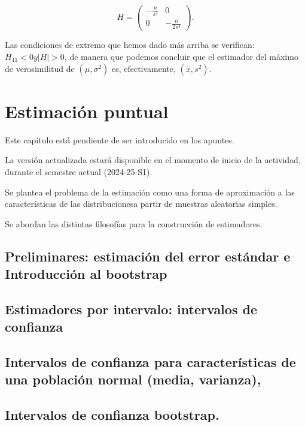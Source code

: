 \documentclass[
]{article}
\begin{document}
\[
H=\left(\begin{array}{cc}
-\frac{n}{s^{2}} & 0 \\
0 & -\frac{n}{2 s^{4}}
\end{array}\right) .
\]

Las condiciones de extremo que hemos dado más arriba se verifican: \(H_{11}<0 y|H|>0\), de manera que podemos concluir que el estimador del máximo de verosimilitud de \(\left(\mu, \sigma^{2}\right)\) es, efectivamente, \(\left(\bar{x}, s^{2}\right)\).

\section{Estimación puntual}\label{estimaciuxf3n-puntual-1}

Este capítulo está pendiente de ser introducido en los apuntes.

La versión actualizada estará disponible en el momento de inicio de la actividad, durante el semestre actual (2024-25-S1).

Se plantea el problema de la estimación como una forma de aproximación a las características de las distribucionesa partir de muestras aleatorias simples.

Se abordan las distintas filosofías para la construcción de estimadores.

\subsection{Preliminares: estimación del error estándar e Introducción al bootstrap}\label{preliminares-estimaciuxf3n-del-error-estuxe1ndar-e-introducciuxf3n-al-bootstrap}

\subsection{Estimadores por intervalo: intervalos de confianza}\label{estimadores-por-intervalo-intervalos-de-confianza}

\subsection{Intervalos de confianza para características de una población normal (media, varianza),}\label{intervalos-de-confianza-para-caracteruxedsticas-de-una-poblaciuxf3n-normal-media-varianza}

\subsection{Intervalos de confianza bootstrap.}\label{intervalos-de-confianza-bootstrap.}
\end{document}
